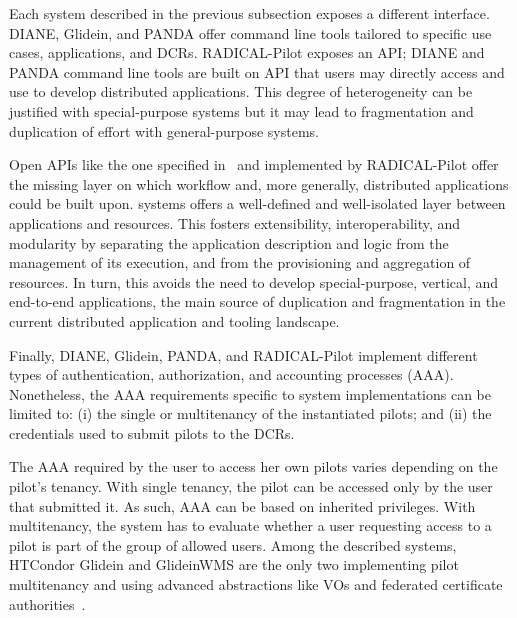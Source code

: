 \documentclass{sig-alternate}
\begin{document}
Each \pilot system described in the previous subsection exposes a different
interface.  DIANE, Glidein, and PANDA offer command
line tools tailored
to specific use cases, applications, and DCRs. RADICAL-Pilot exposes an API;
DIANE and PANDA command line tools are built on API that users may directly
access and use to develop distributed applications. This degree of heterogeneity
can be justified with special-purpose \pilot systems but it may lead to
fragmentation and duplication of effort with general-purpose
systems. 

Open APIs like the one specified in~\cite{luckow2012towards} and implemented by
RADICAL-Pilot offer the missing layer on which workflow and, more generally,
distributed applications could be built upon. %
\pilot systems offers a well-defined and well-isolated layer between
applications and resources. This fosters extensibility, interoperability, and
modularity by separating the application description and logic from the
management of its execution, and from the provisioning and aggregation of
resources. In turn, this avoids the need to develop special-purpose, vertical,
and end-to-end applications, the main source of duplication and fragmentation in
the current distributed application and tooling landscape. 




Finally, DIANE, Glidein, PANDA, and RADICAL-Pilot implement
different types of authentication, authorization, and accounting processes
(AAA). Nonetheless, the AAA requirements specific to \pilot system
implementations can be limited to: (i) the single or multitenancy of the
instantiated pilots; and (ii) the credentials used to submit pilots to the DCRs.

The AAA required by the user to access her own pilots varies depending on the
pilot's tenancy. With single tenancy, the pilot can be accessed only by the user
that submitted it. As such, AAA can be based on inherited privileges. With
multitenancy, the \pilot system has to evaluate whether a user requesting access
to a pilot is part of the group of allowed users. Among the described \pilot
systems, HTCondor Glidein and GlideinWMS are the only two implementing pilot
multitenancy and using advanced abstractions like VOs and federated certificate
authorities~\cite{horwitz2002}.
\end{document}

